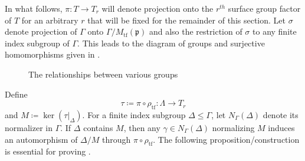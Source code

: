 \documentclass[11pt]{article}
\theoremstyle{plain}
\theoremstyle{definition}
\theoremstyle{remark}
\newcommand{\frakp}{\mathfrak{p}}
\newcommand{\gam}{\gamma}
\newcommand{\Gam}{\Gamma}
\newcommand{\Del}{\Delta}
\newcommand{\Lam}{\Lambda}
\newcommand{\sig}{\sigma}
\newcommand{\lra}{\longrightarrow}
\newcommand{\wh}{\widehat}
\begin{document}
In what follows, $\pi : T \to T_r$ will denote projection onto the $r^{th}$ surface group factor of $T$ for an arbitrary $r$ that will be fixed for the remainder of this section. Let $\sig$ denote projection of $\Gam$ onto $\Gam / M_{\mathrm{tf}}(\frakp)$ and also the restriction of $\sig$ to any finite index subgroup of $\Gam$. This leads to the diagram of groups and surjective homomorphisms given in .
\begin{figure}[h]
\centering
{}
\caption{The relationships between various groups}\label{fig:BigDiagram}
\end{figure}
Define
\begin{equation}\label{eq:TauDef}
\tau \coloneqq \pi \circ \rho_{\mathrm{tf}} : \Lam \lra T_r
\end{equation}
and $M \coloneqq \ker(\tau|_\Del)$. For a finite index subgroup $\Del \le \Gam$, let $N_\Gam(\Del)$ denote its normalizer in $\Gam$. If $\Del$ contains $M$, then any $\gam \in N_\Gam(\Del)$ normalizing $M$ induces an automorphism of $\Del / M$ through $\pi \circ \rho_{\mathrm{tf}}$. The following proposition/construction is essential for proving .
\end{document}
